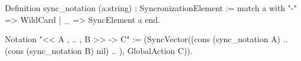 Definition sync_notation (a:string) : SyncronizationElement :=
  match a with
    "-" => WildCard
  | _   => SyncElement a
  end.

Notation "<< A , .. , B >> -> C" := 
 (SyncVector((cons (sync_notation A) .. (cons (sync_notation B) nil) .. ), GlobalAction C)).
